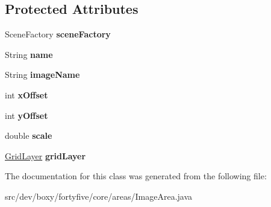 \subsection*{Protected Attributes}
\begin{DoxyCompactItemize}
\item 
\hypertarget{classdev_1_1boxy_1_1fortyfive_1_1core_1_1areas_1_1_image_area_a25be0f3f0211e2d12e40bf1ffdf10758}{
SceneFactory {\bfseries sceneFactory}}
\label{d1/d98/classdev_1_1boxy_1_1fortyfive_1_1core_1_1areas_1_1_image_area_a25be0f3f0211e2d12e40bf1ffdf10758}

\item 
\hypertarget{classdev_1_1boxy_1_1fortyfive_1_1core_1_1areas_1_1_image_area_a51b9dc53fb11c3add3c96f4d74aee3b2}{
String {\bfseries name}}
\label{d1/d98/classdev_1_1boxy_1_1fortyfive_1_1core_1_1areas_1_1_image_area_a51b9dc53fb11c3add3c96f4d74aee3b2}

\item 
\hypertarget{classdev_1_1boxy_1_1fortyfive_1_1core_1_1areas_1_1_image_area_a76dd8173c6e8249f10795037438f8159}{
String {\bfseries imageName}}
\label{d1/d98/classdev_1_1boxy_1_1fortyfive_1_1core_1_1areas_1_1_image_area_a76dd8173c6e8249f10795037438f8159}

\item 
\hypertarget{classdev_1_1boxy_1_1fortyfive_1_1core_1_1areas_1_1_image_area_a9409f35ebf10936533382d90059c2c3b}{
int {\bfseries xOffset}}
\label{d1/d98/classdev_1_1boxy_1_1fortyfive_1_1core_1_1areas_1_1_image_area_a9409f35ebf10936533382d90059c2c3b}

\item 
\hypertarget{classdev_1_1boxy_1_1fortyfive_1_1core_1_1areas_1_1_image_area_a3f336a6b926e94849c68299ce3f585b4}{
int {\bfseries yOffset}}
\label{d1/d98/classdev_1_1boxy_1_1fortyfive_1_1core_1_1areas_1_1_image_area_a3f336a6b926e94849c68299ce3f585b4}

\item 
\hypertarget{classdev_1_1boxy_1_1fortyfive_1_1core_1_1areas_1_1_image_area_a3d9a722024545d2e57b6d78c10ebab5b}{
double {\bfseries scale}}
\label{d1/d98/classdev_1_1boxy_1_1fortyfive_1_1core_1_1areas_1_1_image_area_a3d9a722024545d2e57b6d78c10ebab5b}

\item 
\hypertarget{classdev_1_1boxy_1_1fortyfive_1_1core_1_1areas_1_1_image_area_ac41895b1007a61fedb75f489ec9abb19}{
\hyperlink{classdev_1_1boxy_1_1fortyfive_1_1_grid_layer}{GridLayer} {\bfseries gridLayer}}
\label{d1/d98/classdev_1_1boxy_1_1fortyfive_1_1core_1_1areas_1_1_image_area_ac41895b1007a61fedb75f489ec9abb19}

\end{DoxyCompactItemize}


The documentation for this class was generated from the following file:\begin{DoxyCompactItemize}
\item 
src/dev/boxy/fortyfive/core/areas/ImageArea.java\end{DoxyCompactItemize}
